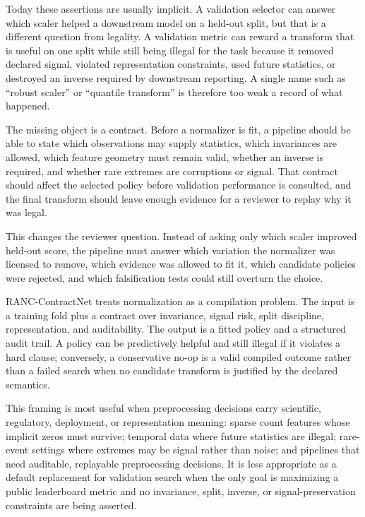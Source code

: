 \documentclass{article}
\begin{document}
Today these assertions are usually implicit. A validation selector can answer
which scaler helped a downstream model on a held-out split, but that is a
different question from legality. A validation metric can reward a transform
that is useful on one split while still being illegal for the task because it
removed declared signal, violated representation constraints, used future
statistics, or destroyed an inverse required by downstream reporting. A single
name such as ``robust scaler'' or ``quantile transform'' is therefore too weak a
record of what happened.

The missing object is a contract. Before a normalizer is fit, a pipeline should
be able to state which observations may supply statistics, which invariances are
allowed, which feature geometry must remain valid, whether an inverse is
required, and whether rare extremes are corruptions or signal. That contract
should affect the selected policy before validation performance is consulted,
and the final transform should leave enough evidence for a reviewer to replay
why it was legal.

This changes the reviewer question. Instead of asking only which scaler improved
held-out score, the pipeline must answer which variation the normalizer was
licensed to remove, which evidence was allowed to fit it, which candidate
policies were rejected, and which falsification tests could still overturn the
choice.

RANC-ContractNet treats normalization as a compilation problem. The input is a
training fold plus a contract over invariance, signal risk, split discipline,
representation, and auditability. The output is a fitted policy and a structured
audit trail. A policy can be predictively helpful and still illegal if it
violates a hard clause; conversely, a conservative no-op is a valid compiled
outcome rather than a failed search when no candidate transform is justified by
the declared semantics.

This framing is most useful when preprocessing decisions carry scientific,
regulatory, deployment, or representation meaning: sparse count features whose
implicit zeros must survive; temporal data where future statistics are illegal;
rare-event settings where extremes may be signal rather than noise; and
pipelines that need auditable, replayable preprocessing decisions. It is less
appropriate as a default replacement for validation search when the only goal is
maximizing a public leaderboard metric and no invariance, split, inverse, or
signal-preservation constraints are being asserted.
\end{document}
